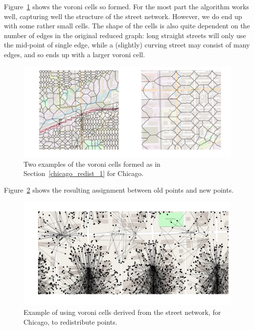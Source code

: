 \documentclass[twoside,a4paper,twocolumn,10pt]{article}
\theoremstyle{plain}
\theoremstyle{definition}
\begin{document}
Figure~\ref{fig:chicago_vor_2} shows the voroni cells so formed.  For the most part the
algorithm works well, capturing well the structure of the street network.  However, we do
end up with some rather small cells.  The shape of the cells is also quite dependent on
the number of edges in the original reduced graph: long straight streets will only use the
mid-point of single edge, while a (slightly) curving street may consist of many edges, and
so ends up with a larger voroni cell.

\begin{figure}
  \includegraphics[width=\textwidth]{chiago_voroni_street_network_polys.png}
  \caption{Two examples of the voroni cells formed as in Section~\ref{chicago_redist_1} for Chicago.}
  \label{fig:chicago_vor_2}
\end{figure}

Figure~\ref{fig:chicago_vor_1} shows the resulting assignment between old points and
new points.

\begin{figure}
  \includegraphics[width=\textwidth]{chicago_redist_network.png}
  \caption{Example of using voroni cells derived from the street network, for Chicago, to redistribute points.}
  \label{fig:chicago_vor_1}
\end{figure}
\end{document}
